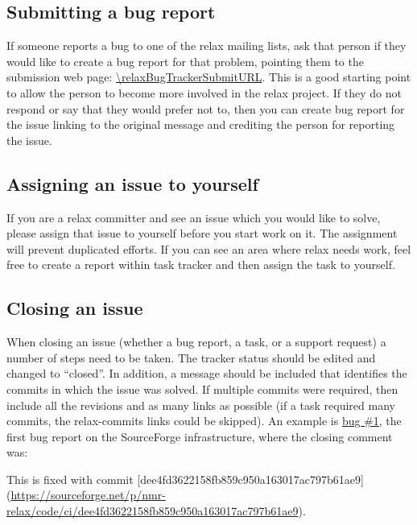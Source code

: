 \subsection{Submitting a bug report}

If someone reports a bug to one of the relax mailing lists, ask that person if they would like to create a bug report for that problem, pointing them to the submission web page: \url{\relaxBugTrackerSubmitURL}.
This is a good starting point to allow the person to become more involved in the relax project.
If they do not respond or say that they would prefer not to, then you can create bug report for the issue linking to the original message and crediting the person for reporting the issue.



\subsection{Assigning an issue to yourself}

If you are a relax committer and see an issue which you would like to solve, please assign that issue to yourself before you start work on it.
The assignment will prevent duplicated efforts.
If you can see an area where relax needs work, feel free to create a report within task tracker and then assign the task to yourself.



\subsection{Closing an issue}

When closing an issue (whether a bug report, a task, or a support request) a number of steps need to be taken.
The tracker status should be edited and changed to ``closed''.
In addition, a message should be included that identifies the commits in which the issue was solved.
If multiple commits were required, then include all the revisions and as many links as possible (if a task required many commits, the relax-commits links could be skipped).
An example is \href{https://sourceforge.net/p/nmr-relax/tickets/1/}{bug \#1}, the first bug report on the SourceForge infrastructure, where the closing comment was:

\begin{exampleenv}
This is fixed with commit [dee4fd3622158fb859c950a163017ac797b61ae9](\url{https://sourceforge.net/p/nmr-relax/code/ci/dee4fd3622158fb859c950a163017ac797b61ae9}).
\end{exampleenv}



